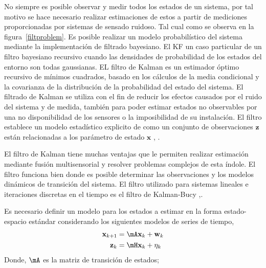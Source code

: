 No siempre es posible observar y medir todos los estados de un sistema,
por tal motivo se hace necesario realizar estimaciones de estos a partir de mediciones proporcionadas por sistemas de sensado ruidoso.
Tal cual como se observa en la figura~\ref{filtproblem}.
Es posible realizar un modelo probabilístico del sistema mediante la implementación de filtrado bayesiano.
El KF un caso particular de un filtro bayesiano recursivo cuando las densidades de probabilidad de los estados del entorno son todas gaussianas.
EL filtro de Kalman es un estimador óptimo recursivo de mínimos cuadrados,
basado en los cálculos de la media condicional y la covarianza de la distribución de la probabilidad del estado del sistema.
El filtrado de Kalman se utiliza con el fin de reducir los efectos causados por el ruido del sistema y de medida, también para poder estimar estados no observables por una no disponibilidad de los sensores o la imposibilidad de su instalación.
El filtro establece un modelo estadístico explicito de como un conjunto de observaciones $\mathbf{z}$ están relacionadas a los parámetro de estado  $\mathbf{x}$ \cite{Bar-Shalom2002}, \cite{Toledo-Moreo2007}.\par
El filtro de Kalman tiene muchas ventajas que le permiten realizar estimación mediante fusión multisensorial y resolver problemas complejos de esta índole.
El filtro funciona bien donde es posible determinar las observaciones y los modelos dinámicos de transición del sistema.
El filtro utilizado para sistemas lineales e iteraciones discretas en el tiempo es el filtro de Kalman-Bucy \cite{Kalman1960},\cite{Kalman1961}.\par
Es necesario definir un modelo para los estados a estimar en la forma estado-espacio estándar considerando los siguientes modelos de series de tiempo,
\begin{align}
	\mathbf{x}_{k+1}&=\mA \mathbf{x}_k + \mathbf{w}_k\\
	\mathbf{z}_{k}&=\mH \mathbf{x}_k + \mathbf{\eta}_k
\end{align}
Donde, $\mA$ es la matriz de transición de estados;
